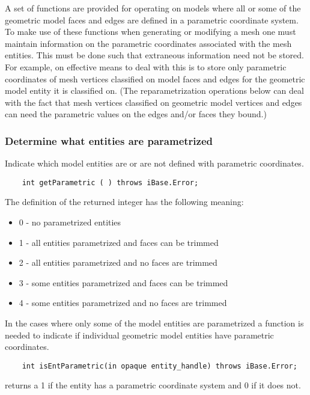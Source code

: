 \documentclass{article}
\begin{document}
A set of functions are provided for operating on models where 
all or some of the geometric model faces and edges are defined 
in a parametric coordinate system. To make use of these functions 
when generating or modifying a mesh one must maintain information 
on the parametric coordinates associated with the mesh entities. 
This must be done such that extraneous information need not be 
stored. For example, on effective means to deal with this is 
to store only parametric coordinates of mesh vertices classified 
on model faces and edges for the geometric model entity it is 
classified on. (The reparametrization operations below can deal 
with the fact that mesh vertices classified on geometric model 
vertices and edges can need the parametric values on the edges 
and/or faces they bound.)\\

\subsubsection{Determine what entities are parametrized}
Indicate which model entities are or are not defined with 
parametric coordinates.

\begin{verbatim}
    int getParametric ( ) throws iBase.Error;
\end{verbatim}
The definition of the returned integer has the following 
meaning:
\begin{itemize}
\item 0 - no parametrized entities
\item 1 - all entities parametrized and faces can be 
trimmed
\item 2 - all entities parametrized and no faces are 
trimmed
\item 3 - some entities parametrized and faces can 
be trimmed
\item 4 - some entities parametrized and no faces are 
trimmed
\end{itemize}
In the cases where only some of the model entities are parametrized 
a function is needed to indicate if individual geometric model 
entities have parametric coordinates.

\begin{verbatim}
    int isEntParametric(in opaque entity_handle) throws iBase.Error;
\end{verbatim}
returns a 1 if the entity has a parametric coordinate system 
and 0 if it does not.\\
\end{document}

